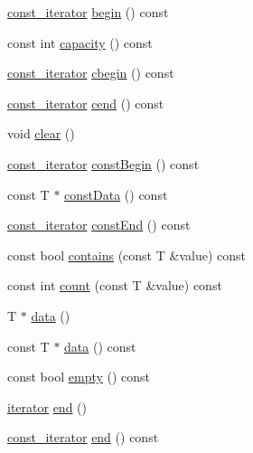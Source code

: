 \begin{DoxyCompactItemize}
\item 
\hyperlink{classprism_1_1_vector_acc6ed07e2d7ed5065feec92a83e46fa4}{const\+\_\+iterator} \hyperlink{classprism_1_1_vector_a4cd1ca2ba159fd073127be98b37f6ba2}{begin} () const 
\item 
const int \hyperlink{classprism_1_1_vector_aa6bfbb4672a51177c6fafbd503e90a92}{capacity} () const 
\item 
\hyperlink{classprism_1_1_vector_acc6ed07e2d7ed5065feec92a83e46fa4}{const\+\_\+iterator} \hyperlink{classprism_1_1_vector_a3cb4a9878dfd0b58b8e0a5c01f5d37f5}{cbegin} () const 
\item 
\hyperlink{classprism_1_1_vector_acc6ed07e2d7ed5065feec92a83e46fa4}{const\+\_\+iterator} \hyperlink{classprism_1_1_vector_a3ac39de85562660281a0fd7601ef203b}{cend} () const 
\item 
void \hyperlink{classprism_1_1_vector_acb8a681b958856d257b145930014c6fa}{clear} ()
\item 
\hyperlink{classprism_1_1_vector_acc6ed07e2d7ed5065feec92a83e46fa4}{const\+\_\+iterator} \hyperlink{classprism_1_1_vector_a6d03b3bb9cc1292e1698674080ff3334}{const\+Begin} () const 
\item 
const T $\ast$ \hyperlink{classprism_1_1_vector_a6e6fee098958130862af58cafeb27d65}{const\+Data} () const 
\item 
\hyperlink{classprism_1_1_vector_acc6ed07e2d7ed5065feec92a83e46fa4}{const\+\_\+iterator} \hyperlink{classprism_1_1_vector_a99331f9557172b3e3e34fb36f23e5cc5}{const\+End} () const 
\item 
const bool \hyperlink{classprism_1_1_vector_a6b21bf92cde4f91cb8d14efb4e315ea0}{contains} (const T \&value) const 
\item 
const int \hyperlink{classprism_1_1_vector_ad40e1dc908502680797f37312dda7a4f}{count} (const T \&value) const 
\item 
T $\ast$ \hyperlink{classprism_1_1_vector_a0da05f1f73ce9b35f3837bb7fca4a81e}{data} ()
\item 
const T $\ast$ \hyperlink{classprism_1_1_vector_a148789766065acd9338e8e6d4dcbdd2d}{data} () const 
\item 
const bool \hyperlink{classprism_1_1_vector_ad710950cfeaaf977ef629e69fc39b5a7}{empty} () const 
\item 
\hyperlink{classprism_1_1_vector_aa547779173a63f6f8c9b2887498d10eb}{iterator} \hyperlink{classprism_1_1_vector_a329f8549c259232b232e8f361bc4bcb1}{end} ()
\item 
\hyperlink{classprism_1_1_vector_acc6ed07e2d7ed5065feec92a83e46fa4}{const\+\_\+iterator} \hyperlink{classprism_1_1_vector_a0a5a10cd6cd6790d2b3e2546af742fc9}{end} () const 

\end{DoxyCompactItemize}
